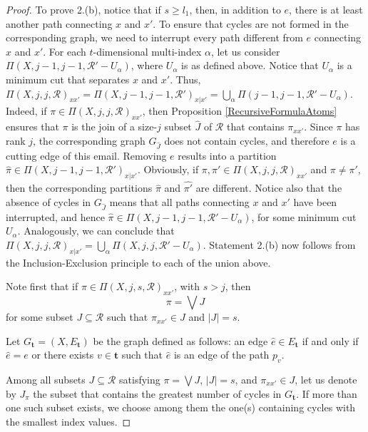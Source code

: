 \documentclass[12pt]{extarticle}
\begin{document}
\begin{proof}
		To prove 2.(b), notice that if $s\geq l_1$, then, in addition to $e$,  there is at least another path connecting $x$ and $x'$. To ensure that cycles are not formed in the corresponding graph, we need to interrupt every path different from $e$ connecting $x$ and $x'$. For each  $t$-dimensional multi-index $\alpha$, let us consider $\Pi(X,j-1,j-1,\mathcal{R}'-U_{\alpha})$, where $U_{\alpha}$ is as defined above. Notice that $U_{\alpha}$ is a minimum cut that separates $x$ and $x'$. Thus, $\Pi(X,j,j,\mathcal{R})_{xx'}=\Pi(X,j-1,j-1,\mathcal{R}')_{x|x'}=\bigcup_{\alpha}\Pi(j-1,j-1,\mathcal{R}'-U_{\alpha})$. Indeed, if $\pi\in \Pi(X,j,j,\mathcal{R})_{xx'}$, then Proposition \ref{RecursiveFormulaAtoms} ensures that $\pi$ is the join of a size-$j$ subset $\hat{J}$ of $\mathcal{R}$ that contains $\pi_{xx'}$. Since $\pi$ has rank $j$, the corresponding graph $G_{\hat{J}}$ does not contain cycles, and therefore $e$ is a cutting edge of this email. Removing $e$ results into a partition $\hat{\pi}\in \Pi(X,j-1,j-1,\mathcal{R}')_{x|x'}$. Obviously, if  $\pi,\pi'\in \Pi(X,j,j,\mathcal{R})_{xx'}$ and $\pi\neq\pi'$, then the corresponding partitions $\hat{\pi}$ and $\hat{\pi'}$ are different. Notice also that the absence of cycles in $G_{\hat{J}}$ means that all paths connecting $x$ and $x'$ have been interrupted, and hence $\hat{\pi}\in\Pi(X,j-1,j-1,\mathcal{R}'-U_{\alpha})$, for some minimum cut $U_{\alpha}$. Analogously, we can conclude that $\Pi(X,j,j,\mathcal{R})_{x|x'}=\bigcup_{\alpha}\Pi(X,j,j,\mathcal{R}'-U_{\alpha})$.
		Statement 2.(b) now follows from the Inclusion-Exclusion principle to each of the union above.
		
		Note first that if \( \pi \in \Pi(X, j, s, \mathcal{R})_{xx'} \), with \( s > j \), then
		\[
		\pi = \bigvee J
		\]
		for some subset \( J \subseteq \mathcal{R} \) such that \( \pi_{xx'} \in J \) and \( |J| = s \).
		
		Let \( G_{\mathbf{t}} = (X, E_{\mathbf{t}}) \) be the graph defined as follows: an edge \( \hat{e} \in E_{\mathbf{t}} \) if and only if \( \hat{e} = e \) or there exists \( v \in \mathbf{t} \) such that \( \hat{e} \) is an edge of the path \( p_v \).
		
		Among all subsets \( J \subseteq \mathcal{R} \) satisfying \( \pi = \bigvee J \), \( |J| = s \), and \( \pi_{xx'} \in J \), let us denote by \( J_{\pi} \) the subset that contains the greatest number of cycles in \( G_{\mathbf{t}} \). If more than one such subset exists, we choose among them the one(s) containing cycles with the smallest index values.
		

\end{proof}
\end{document}
